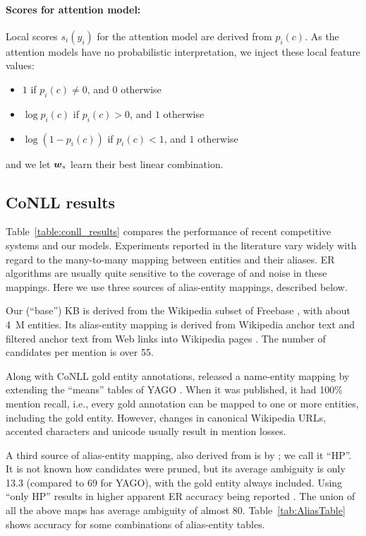 \paragraph*{Scores for attention model:}
Local scores $s_i(y_i)$ for the attention model are derived from
$p_i(c)$.  As the attention models have no probabilistic
interpretation, we inject these local feature values:
\begin{itemize}
\item $1$ if $p_i(c)\ne 0$, and 0 otherwise
\item $\log p_i(c)$ if $p_i(c)>0$, and $1$ otherwise
\item $\log(1-p_i(c))$ if $p_i(c)<1$, and $1$ otherwise
\end{itemize}
and we let $\boldsymbol{w}_s$ learn their best linear combination.  



\subsection{CoNLL results}

Table~\ref{table:conll_results} compares the performance of recent
competitive systems and our models.  Experiments reported in the
literature vary widely with regard to the many-to-many mapping between
entities and their aliases.  ER algorithms are usually quite sensitive
to the coverage of and noise in these mappings.  Here we use three
sources of alias-entity mappings, described below.

Our (``base'') KB is derived from the Wikipedia
subset of Freebase , with about 4~M entities.
Its alias-entity mapping is derived from Wikipedia anchor text and
 filtered anchor text from Web links into Wikipedia pages
\cite{singh12:wiki-links}.  The number of candidates per mention is
over 55.

Along with CoNLL gold entity annotations,
 released a name-entity mapping by extending the
``means'' tables of YAGO \cite{hoffart2013yago2}.  When it was
published, it had 100\% mention recall, i.e., every gold annotation
can be mapped to one or more entities, including the gold entity.
However, changes in canonical Wikipedia URLs, accented characters and
unicode usually result in mention losses.

A third source of alias-entity mapping, also derived from
 is by ; we call it ``HP''.
It is not known how candidates were pruned, but its average ambiguity
is only 13.3 (compared to 69 for YAGO), with the gold entity always
included.  Using ``only HP'' results in higher apparent ER accuracy
being reported \cite{Pershina2015,YamadaS0T16}.  The union of all the
above maps has average ambiguity of almost 80.
Table~\ref{tab:AliasTable} shows accuracy for some combinations of
alias-entity tables.




